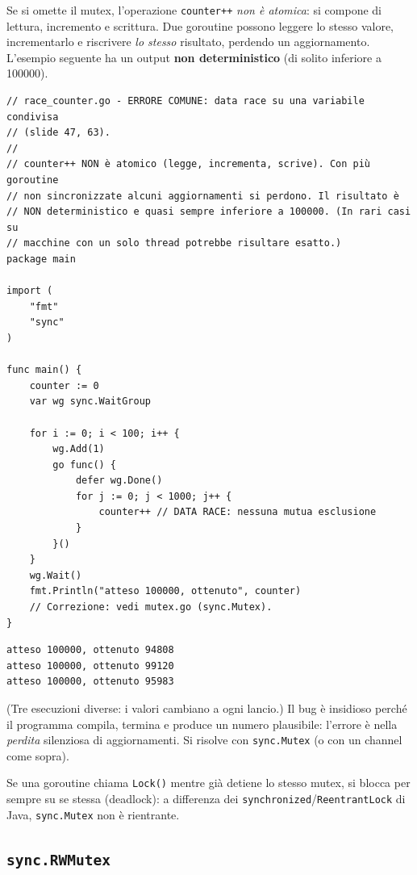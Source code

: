 \documentclass[11pt,a4paper]{report}
\newcommand{\cod}[1]{\texttt{#1}}
\begin{document}
\begin{attenzione}
Se si omette il mutex, l'operazione \cod{counter++} \emph{non è atomica}: si
compone di lettura, incremento e scrittura. Due goroutine possono leggere lo
stesso valore, incrementarlo e riscrivere \emph{lo stesso} risultato,
perdendo un aggiornamento. L'esempio seguente ha un output \textbf{non
deterministico} (di solito inferiore a 100000).

\begin{lstlisting}[style=gocode,caption={\texttt{06\_concurrency/race\_counter.go}}]
// race_counter.go - ERRORE COMUNE: data race su una variabile condivisa
// (slide 47, 63).
//
// counter++ NON è atomico (legge, incrementa, scrive). Con più goroutine
// non sincronizzate alcuni aggiornamenti si perdono. Il risultato è
// NON deterministico e quasi sempre inferiore a 100000. (In rari casi su
// macchine con un solo thread potrebbe risultare esatto.)
package main

import (
	"fmt"
	"sync"
)

func main() {
	counter := 0
	var wg sync.WaitGroup

	for i := 0; i < 100; i++ {
		wg.Add(1)
		go func() {
			defer wg.Done()
			for j := 0; j < 1000; j++ {
				counter++ // DATA RACE: nessuna mutua esclusione
			}
		}()
	}
	wg.Wait()
	fmt.Println("atteso 100000, ottenuto", counter)
	// Correzione: vedi mutex.go (sync.Mutex).
}
\end{lstlisting}
\begin{lstlisting}[style=output]
atteso 100000, ottenuto 94808
atteso 100000, ottenuto 99120
atteso 100000, ottenuto 95983
\end{lstlisting}
(Tre esecuzioni diverse: i valori cambiano a ogni lancio.) Il bug è insidioso perché il programma compila,
termina e produce un numero plausibile: l'errore è nella \emph{perdita}
silenziosa di aggiornamenti. Si risolve con \cod{sync.Mutex} (o con un
channel come sopra).
\end{attenzione}

\begin{nota}
Se una goroutine chiama \cod{Lock()} mentre già detiene lo stesso mutex, si
blocca per sempre su se stessa (deadlock): a differenza dei
\cod{synchronized}/\cod{ReentrantLock} di Java, \cod{sync.Mutex} non è
rientrante.
\end{nota}

\subsection{\texttt{sync.RWMutex}}
\end{document}
